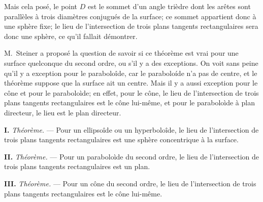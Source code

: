 \documentclass[11pt,a4paper]{book}
\begin{document}
Mais cela pos\'e, le point $D$ est le sommet d'un angle tri\`edre dont les
ar\^etes sont parall\`eles \`a trois diam\`etres conjugu\'es de la surface;
ce sommet appartient donc \`a une sph\`ere fixe; le lieu de l'intersection
de trois plans tangents rectangulaires sera donc une sph\`ere, ce qu'il
fallait d\'emontrer.

M.~Steiner a propos\'e la question de savoir si ce th\'eor\`eme est vrai
pour une surface quelconque du second ordre, ou s'il y a des exceptions.
On voit sans peine qu'il y a exception pour le parabolo\^ide, car le
parabolo\'ide n'a pas de centre, et le th\'eor\`eme suppose que la surface
ait un centre. Mais il y a aussi exception pour le c\^one et pour le
parabolo\`ide; en effet, pour le c\^one, le lieu de l'intersection de trois
plans tangents rectangulaires est le c\^one lui-m\^eme, et pour le
parabolo\`ide \`a plan directeur, le lieu est le plan directeur.

\medskip

\textbf{I.} \textit{Th\'eor\`eme.} --- Pour un ellipso\^ide ou un hyperbolo\^ide,
le lieu de l'intersection de trois plans tangents rectangulaires est une
sph\`ere concentrique \`a la surface.

\medskip

\textbf{II.} \textit{Th\'eor\`eme.} --- Pour un parabolo\`ide du second ordre,
le lieu de l'intersection de trois plans tangents rectangulaires est un plan.

\medskip

\textbf{III.} \textit{Th\'eor\`eme.} --- Pour un c\^one du second ordre,
le lieu de l'intersection de trois plans tangents rectangulaires est le
c\^one lui-m\^eme.

\medskip
\end{document}
